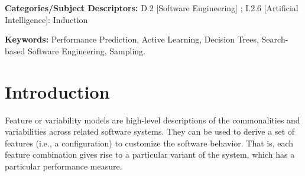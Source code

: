 \documentclass{sig-alternative}
\begin{document}
\vspace{1mm}
\noindent
{\bf Categories/Subject Descriptors:} 
D.2 [Software Engineering] ;
I.2.6 [Artificial Intelligence]: Induction

 
\noindent
{\bf Keywords:} Performance Prediction, 
Active Learning, 
Decision Trees,
Search-based Software Engineering, Sampling.
 

 
\section{Introduction}
 

Feature or variability models are high-level descriptions of the commonalities and variabilities across related software systems. They can be used to derive a set of features (i.e., a configuration) to customize the software behavior. That is, each feature combination gives rise to a particular variant of the system, which has a particular performance measure.
\end{document}
